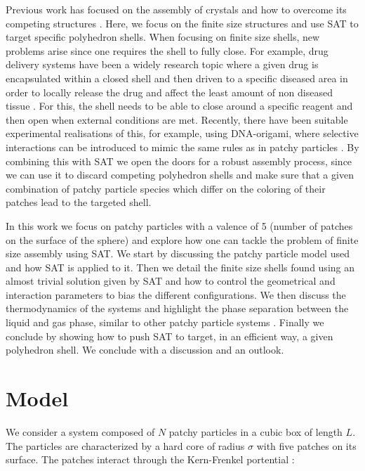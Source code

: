 \documentclass[a4paper, amsfonts, amssymb, amsmath, reprint, showkeys, nofootinbib, twoside]{revtex4-1}
\begin{document}
Previous work has focused on the assembly of crystals and how to overcome its competing structures \cite{Romano2020a}. Here, we focus on the finite size structures and use SAT to target specific polyhedron shells. When focusing on finite size shells, new problems arise since one requires the shell to fully close. For example, drug delivery systems have been a widely research topic where a given drug is encapsulated within a closed shell and then driven to a specific diseased area in order to locally release the drug and affect the least amount of non diseased tissue \cite{Huang2007, Uchida2007}. For this, the shell needs to be able to close around a specific reagent and then open when external conditions are met. Recently, there have been suitable experimental realisations of this, for example, using DNA-origami, where selective interactions can be introduced to mimic the same rules as in patchy particles \cite{Mosayebi2017, Lee2022, Jun2021, Rothemund2006}. By combining this with SAT we open the doors for a robust assembly process, since we can use it to discard competing polyhedron shells and make sure that a given combination of patchy particle species which differ on the coloring of their patches lead to the targeted shell.

In this work we focus on patchy particles with a valence of 5 (number of patches on the surface of the sphere) and explore how one can tackle the problem of finite size assembly using SAT. We start by discussing the patchy particle model used and how SAT is applied to it. Then we detail the finite size shells found using an almost trivial solution given by SAT and how to control the geometrical and interaction parameters to bias the different configurations. We then discuss the thermodynamics of the systems and highlight the phase separation between the liquid and gas phase, similar to other patchy particle systems \cite{Sciortino2009}. Finally we conclude by showing how to push SAT to target, in an efficient way, a given polyhedron shell. We conclude with a discussion and an outlook.

\section{Model}

We consider a system composed of $N$ patchy particles in a cubic box of length $L$. The particles are characterized by a hard core of radius $\sigma$ with five patches on its surface. The patches interact through the Kern-Frenkel portential \cite{Kern2003}:
\end{document}
